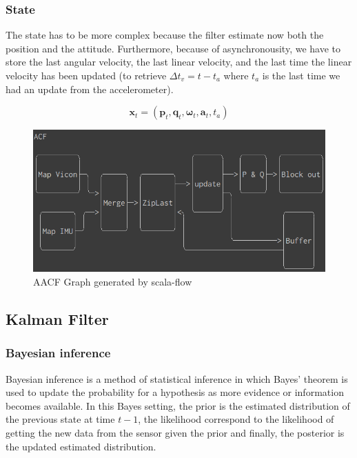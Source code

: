 \documentclass[12pt,]{article}
\begin{document}
\subsubsection{State}\label{state-2}

The state has to be more complex because the filter estimate now both
the position and the attitude. Furthermore, because of asynchronousity,
we have to store the last angular velocity, the last linear velocity,
and the last time the linear velocity has been updated (to retrieve
\(\Delta t_v = t - t_a\) where \(t_a\) is the last time we had an update
from the accelerometer).

\[\mathbf{x}_t = (\mathbf{p}_t, \mathbf{q}_t, \boldsymbol{\omega}_t, \mathbf{a}_t, t_a)\]

\begin{figure}
\centering
\includegraphics{acf.png}
\caption{AACF Graph generated by scala-flow}
\end{figure}

\subsection{Kalman Filter}\label{kalman-filter}

\subsubsection{Bayesian inference}\label{bayesian-inference}

Bayesian inference is a method of statistical inference in which Bayes'
theorem is used to update the probability for a hypothesis as more
evidence or information becomes available. In this Bayes setting, the
prior is the estimated distribution of the previous state at time
\(t-1\), the likelihood correspond to the likelihood of getting the new
data from the sensor given the prior and finally, the posterior is the
updated estimated distribution.
\end{document}
